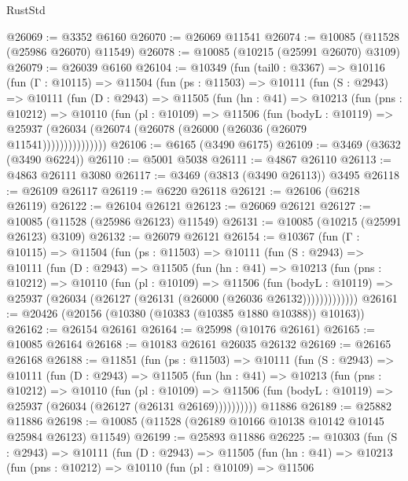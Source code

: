 \begin{lexlean}{RustStd}
\begin{coremodule}
@26069 := @3352 @6160
@26070 := @26069 @11541
@26074 := @10085 (@11528 (@25986 @26070) @11549)
@26078 := @10085 (@10215 (@25991 @26070) @3109)
@26079 := @26039 @6160
@26104 := @10349
    (fun (tail0 : @3367) =>
    @10116
      (fun (Γ : @10115) =>
      @11504
        (fun (ps : @11503) =>
        @10111
          (fun (S : @2943) =>
          @10111
            (fun (D : @2943) =>
            @11505
              (fun (hn : @41) =>
              @10213
                (fun (pns : @10212) =>
                @10110
                  (fun (pl : @10109) =>
                  @11506
                    (fun (bodyL : @10119) =>
                    @25937 (@26034 (@26074 (@26078 (@26000 (@26036 (@26079 @11541)))))))))))))))
@26106 := @6165 (@3490 @6175)
@26109 := @3469 (@3632 (@3490 @6224))
@26110 := @5001 @5038
@26111 := @4867 @26110
@26113 := @4863 @26111 @3080
@26117 := @3469 (@3813 (@3490 @26113)) @3495
@26118 := @26109 @26117
@26119 := @6220 @26118
@26121 := @26106 (@6218 @26119)
@26122 := @26104 @26121
@26123 := @26069 @26121
@26127 := @10085 (@11528 (@25986 @26123) @11549)
@26131 := @10085 (@10215 (@25991 @26123) @3109)
@26132 := @26079 @26121
@26154 := @10367
    (fun (Γ : @10115) =>
    @11504
      (fun (ps : @11503) =>
      @10111
        (fun (S : @2943) =>
        @10111
          (fun (D : @2943) =>
          @11505
            (fun (hn : @41) =>
            @10213
              (fun (pns : @10212) =>
              @10110
                (fun (pl : @10109) =>
                @11506
                  (fun (bodyL : @10119) =>
                  @25937 (@26034 (@26127 (@26131 (@26000 (@26036 @26132)))))))))))))
@26161 := @20426 (@20156 (@10380 (@10383 (@10385 @1880 @10388)) @10163))
@26162 := @26154 @26161
@26164 := @25998 (@10176 @26161)
@26165 := @10085 @26164
@26168 := @10183 @26161 @26035 @26132
@26169 := @26165 @26168
@26188 := @11851
    (fun (ps : @11503) =>
    @10111
      (fun (S : @2943) =>
      @10111
        (fun (D : @2943) =>
        @11505
          (fun (hn : @41) =>
          @10213
            (fun (pns : @10212) =>
            @10110
              (fun (pl : @10109) =>
              @11506 (fun (bodyL : @10119) => @25937 (@26034 (@26127 (@26131 @26169))))))))))
    @11886
@26189 := @25882 @11886
@26198 := @10085 (@11528 (@26189 @10166 @10138 @10142 @10145 @25984 @26123) @11549)
@26199 := @25893 @11886
@26225 := @10303
    (fun (S : @2943) =>
    @10111
      (fun (D : @2943) =>
      @11505
        (fun (hn : @41) =>
        @10213
          (fun (pns : @10212) =>
          @10110
            (fun (pl : @10109) =>
            @11506

\end{coremodule}
\end{lexlean}

